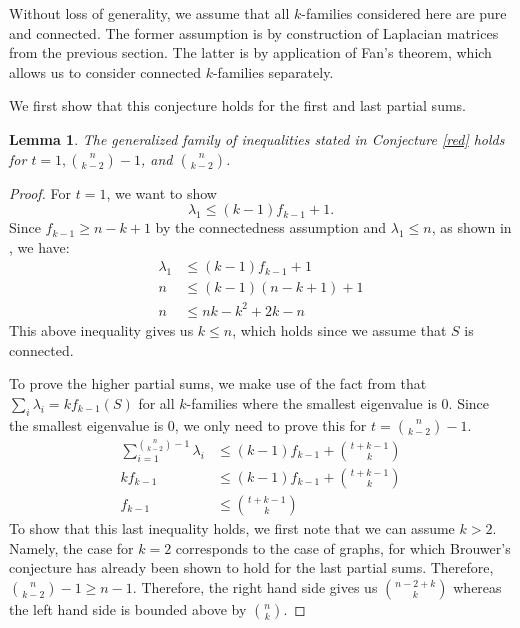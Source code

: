 \documentclass[11pt]{article}
\newtheorem{lm}{Lemma}
\begin{document}
\vspace{2mm}

Without loss of generality, we assume that all $k$-families considered here are pure and connected. The former assumption is by construction of Laplacian matrices from the previous section. The latter is by application of Fan's theorem, which allows us to consider connected $k$-families separately.

We first show that this conjecture holds for the first and last partial sums.

\begin{lm}
The generalized family of inequalities stated in Conjecture \ref{red} holds for $t = 1, \binom{n}{k - 2}-1$, and $\binom{n}{k - 2}$.
\end{lm}


\begin{proof}


For $t = 1$, we want to show
$$\lambda_1 \leq (k-1)f_{k-1} + 1.$$
Since $f_{k - 1}\geq n - k + 1$ by the connectedness assumption and $\lambda_1 \leq n$, as shown in \cite{BH}, we have:
\begin{align*}
\lambda_1 &\leq (k-1)f_{k-1} + 1\\
n & \leq (k - 1)(n - k + 1) + 1\\
n & \leq nk - k^2 + 2k - n
\end{align*}
This above inequality gives us $k \leq n$, which holds since we assume that $S$ is connected. 

To prove the higher partial sums, we make use of the fact from \cite{BH} that $\sum_i \lambda_i = k f_{k-1}(S)$ for all $k$-families where the smallest eigenvalue is $0$. Since the smallest eigenvalue is $0$, we only need to prove this for $t = \binom{n}{k - 2} -1$.
\begin{align*}
\sum_{i = 1}^{\binom{n}{k - 2} -1} \lambda_i & \leq (k - 1) f_{k -1} + \binom{t + k - 1}{k}\\
k f_{k - 1} & \leq (k - 1) f_{k -1} + \binom{t + k - 1}{k}\\
f_{k - 1} & \leq \binom{t + k - 1}{k}
\end{align*}
To show that this last inequality holds, we first note that we can assume $k > 2$. Namely, the case for $k = 2$ corresponds to the case of graphs, for which Brouwer's conjecture has already been shown to hold for the last partial sums. Therefore, $\binom{n}{k - 2} -1 \geq n - 1$. Therefore, the right hand side gives us $\binom{n - 2 + k}{k}$ whereas the left hand side is bounded above by $\binom{n}{k}$.

\end{proof}
\end{document}
